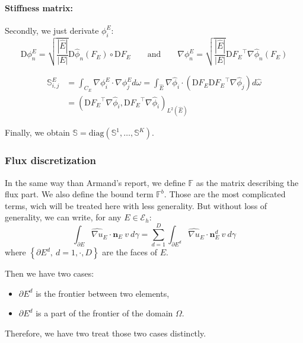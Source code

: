 \documentclass[a4paper,10pt,draft]{article}
\begin{document}
\paragraph{Stiffness matrix:} Secondly, we just derivate $\phi_i^E$:
\begin{equation*}
 \mathrm{D}\phi_n^E = \sqrt{\frac{|\hat E|}{|E|}} \mathrm{D}\hat \phi_n(F_E) \circ \mathrm{D} F_E 
\qquad \text{and} \qquad \nabla \phi_n^E = \sqrt{\frac{|\hat E|}{|E|}} {\mathrm{D} F_E}^\top 
\nabla \hat \phi_n(F_E) 
\end{equation*}

\begin{align*}
 \mathbb{S}_{i,j}^E &= \int_{C_E} \nabla \phi_i^E \cdot \nabla \phi_j^E d\omega = 
\int_{\hat E} \nabla \hat \phi_i \cdot ( \mathrm{D} F_E{\mathrm{D} F_E}^\top \nabla \hat 
\phi_j) d\hat \omega \\
&= \left( {\mathrm{D} F_E}^\top \nabla \hat \phi_i , {\mathrm{D} F_E}^\top \nabla \hat \phi_i  
\right)_{L^2(\hat E)}
\end{align*}

Finally, we obtain $\mathbb{S} = \mathrm{diag} (\mathbb{S}^1,\dots,\mathbb{S}^K)$.

\subsubsection{Flux discretization}

In the same way than Armand's report, we define $\mathbb{F}$ as the matrix describing the flux 
part. We also define the bound  term $\mathbb{F}^b$. Those are the most complicated terms, wich will 
be treated here with less generality. But without loss of generality, we can write, for any $E\in 
\mathcal{E}_h$:
\begin{equation*}
 \int_{\partial E} \widehat{\nabla u}_E \cdot \mathbf{n}_E\ v\ d\gamma 
 = \sum_{d=1}^D \int_{\partial E^d} \widehat{\nabla u}_E \cdot \mathbf{n}_E^d\ v\ d\gamma
\end{equation*}
where $\left\{ \partial E^d,\ d=1,\cdot,D \right\}$ are the faces of $E$.

Then we have two cases:
\begin{itemize}
 \item $\partial E^d$ is the frontier between two elements,
 \item $\partial E^d$ is a part of the frontier of the domain $\Omega$.
\end{itemize}
Therefore, we have two treat those two cases distinctly.
\end{document}
